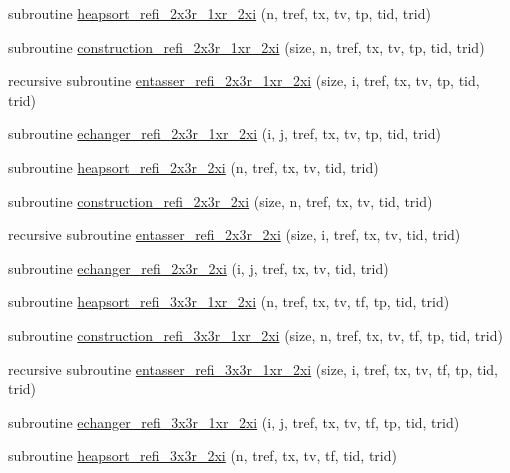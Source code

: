 \begin{DoxyCompactItemize}
\item 
subroutine \hyperlink{namespacemodsortinterf_a662bed8ed392d0d204cc36d1e48fce5b}{heapsort\+\_\+refi\+\_\+2x3r\+\_\+1xr\+\_\+2xi} (n, tref, tx, tv, tp, tid, trid)
\item 
subroutine \hyperlink{namespacemodsortinterf_a0f142d1542ca18e784179367feaa2da8}{construction\+\_\+refi\+\_\+2x3r\+\_\+1xr\+\_\+2xi} (size, n, tref, tx, tv, tp, tid, trid)
\item 
recursive subroutine \hyperlink{namespacemodsortinterf_add447bee1dc15569b2978988dd7f49f8}{entasser\+\_\+refi\+\_\+2x3r\+\_\+1xr\+\_\+2xi} (size, i, tref, tx, tv, tp, tid, trid)
\item 
subroutine \hyperlink{namespacemodsortinterf_a8d80b3f18a439642b1f44e9cc0b624dd}{echanger\+\_\+refi\+\_\+2x3r\+\_\+1xr\+\_\+2xi} (i, j, tref, tx, tv, tp, tid, trid)
\item 
subroutine \hyperlink{namespacemodsortinterf_af0070ac4a4a32d7b75892c431a266ce5}{heapsort\+\_\+refi\+\_\+2x3r\+\_\+2xi} (n, tref, tx, tv, tid, trid)
\item 
subroutine \hyperlink{namespacemodsortinterf_a36e0afef1ddbaec6e02812e1e6cf412f}{construction\+\_\+refi\+\_\+2x3r\+\_\+2xi} (size, n, tref, tx, tv, tid, trid)
\item 
recursive subroutine \hyperlink{namespacemodsortinterf_a4c07f7c23233d32c941f288e1863160e}{entasser\+\_\+refi\+\_\+2x3r\+\_\+2xi} (size, i, tref, tx, tv, tid, trid)
\item 
subroutine \hyperlink{namespacemodsortinterf_a40aaabf1d55c89e6eadd1326df9395e5}{echanger\+\_\+refi\+\_\+2x3r\+\_\+2xi} (i, j, tref, tx, tv, tid, trid)
\item 
subroutine \hyperlink{namespacemodsortinterf_a3d2a0468246523fb3fc1a3b52551e1b5}{heapsort\+\_\+refi\+\_\+3x3r\+\_\+1xr\+\_\+2xi} (n, tref, tx, tv, tf, tp, tid, trid)
\item 
subroutine \hyperlink{namespacemodsortinterf_a8a63b4674b7d0bad760142680729439c}{construction\+\_\+refi\+\_\+3x3r\+\_\+1xr\+\_\+2xi} (size, n, tref, tx, tv, tf, tp, tid, trid)
\item 
recursive subroutine \hyperlink{namespacemodsortinterf_a0f52d0bfff8c94a0ecd39bc4140440f7}{entasser\+\_\+refi\+\_\+3x3r\+\_\+1xr\+\_\+2xi} (size, i, tref, tx, tv, tf, tp, tid, trid)
\item 
subroutine \hyperlink{namespacemodsortinterf_a532d415d4356c7063bbe4c307d66c2d4}{echanger\+\_\+refi\+\_\+3x3r\+\_\+1xr\+\_\+2xi} (i, j, tref, tx, tv, tf, tp, tid, trid)
\item 
subroutine \hyperlink{namespacemodsortinterf_ab0689c4b525c7b9a1ef10a4dc3ab05ec}{heapsort\+\_\+refi\+\_\+3x3r\+\_\+2xi} (n, tref, tx, tv, tf, tid, trid)

\end{DoxyCompactItemize}
